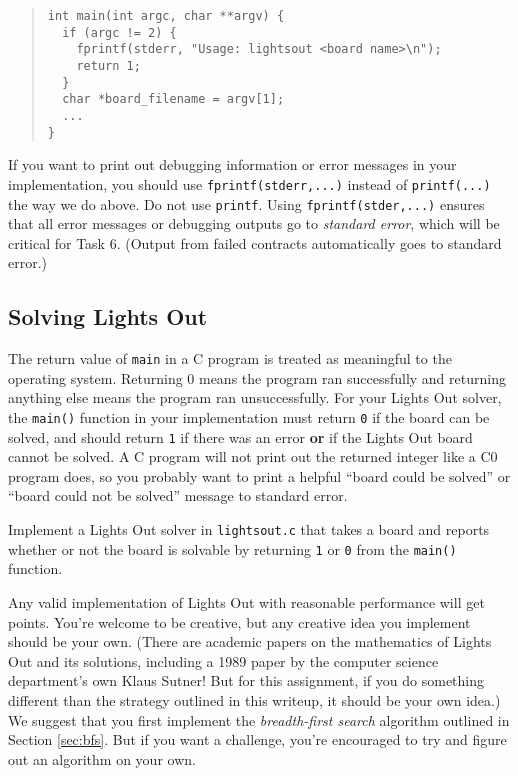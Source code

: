 \documentclass[12pt]{exam}
\begin{document}
\begin{quote}
\begin{lstlisting}[numbers=none]
int main(int argc, char **argv) {
  if (argc != 2) {
    fprintf(stderr, "Usage: lightsout <board name>\n");
    return 1;
  }
  char *board_filename = argv[1];
  ...
}
\end{lstlisting}
\end{quote}

If you want to print out debugging information or error messages in
your implementation, you should use \lstinline'fprintf(stderr,...)'
instead of \lstinline'printf(...)' the way we do above. Do not use
\lstinline'printf'.  Using \lstinline'fprintf(stder,...)' ensures that
all error messages or debugging outputs go to \emph{standard error},
which will be critical for Task 6. (Output from failed contracts
automatically goes to standard error.)


\subsection{Solving Lights Out}

The return value of \lstinline'main' in a C program is treated as
meaningful to the operating system. Returning 0 means the program ran
successfully and returning anything else means the program ran
unsuccessfully. For your Lights Out solver, the \lstinline'main()'
function in your implementation must return \lstinline'0' if the board
can be solved, and should return \lstinline'1' if there was an error
\textbf{or} if the Lights Out board cannot be solved. A C program will
not print out the returned integer like a C0 program does, so you
probably want to print a helpful ``board could be solved'' or ``board
could not be solved'' message to standard error.

\begin{task}[6]
  Implement a Lights Out solver in \lstinline'lightsout.c' that takes
  a board and reports whether or not the board is solvable by
  returning \lstinline'1' or \lstinline'0' from the \lstinline'main()'
  function.
\end{task}

Any valid implementation of Lights Out with reasonable performance
will get points. You're welcome to be creative, but any creative idea
you implement should be your own. (There are academic papers on the
mathematics of Lights Out and its solutions, including a 1989 paper by
the computer science department's own Klaus Sutner! But for this
assignment, if you do something different than the strategy outlined
in this writeup, it should be your own idea.) We suggest that you
first implement the \emph{breadth-first search} algorithm outlined in
Section \ref{sec:bfs}.  But if you want a challenge, you're encouraged
to try and figure out an algorithm on your own.
\end{document}
